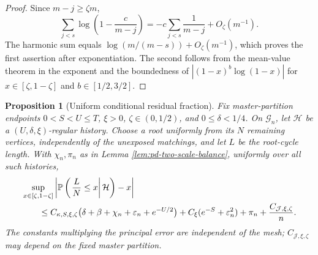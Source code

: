 \documentclass[11pt]{article}
\newtheorem{proposition}[theorem]{Proposition}
\theoremstyle{remark}
\newcommand{\Pp}{\mathbb P}
\begin{document}
\begin{proof}
Since $m-j\ge\zeta m$,
\[
 \sum_{j<s}\log\left(1-\frac c{m-j}\right)
 =-c\sum_{j<s}\frac1{m-j}+O_\zeta(m^{-1}).
\]
The harmonic sum equals
$\log(m/(m-s))+O_\zeta(m^{-1})$, which proves the first assertion after
exponentiation.  The second follows from the mean-value theorem in the exponent
and the boundedness of $|(1-x)^b\log(1-x)|$ for
$x\in[\zeta,1-\zeta]$ and $b\in[1/2,3/2]$.
\end{proof}

\begin{proposition}[Uniform conditional residual fraction]
\label{prop:pd-uniform-residual-fraction}
Fix master-partition endpoints $0<S<U\le T$, $\xi>0$,
$\zeta\in(0,1/2)$, and $0\le\delta<1/4$.  On $\mathcal G_n$, let
$\mathcal H$ be a $(U,\delta,\xi)$-regular history.  Choose a root uniformly
from its $N$ remaining vertices, independently of the unexposed matchings, and
let $L$ be the root-cycle length.  With $\chi_n,\pi_n$ as in Lemma
\ref{lem:pd-two-scale-balance}, uniformly over all such histories,
\begin{align}
 &\sup_{x\in[\zeta,1-\zeta]}
 \left|\Pp\left(\left.\frac LN\le x\right|\mathcal H\right)-x\right|
 \notag\\
 &\qquad\le
 C_{\kappa,S,\xi,\zeta}
 \bigl(\delta+\beta+\chi_n+\varepsilon_n+e^{-U/2}\bigr)
 +C_\xi(e^{-S}+\varepsilon_n^2)
 +\pi_n+\frac{C_{\mathcal J,\xi,\zeta}}n.
 \label{eq:pd-root-cdf}
\end{align}
The constants multiplying the principal error are independent of the mesh;
$C_{\mathcal J,\xi,\zeta}$ may depend on the fixed master partition.
\end{proposition}
\end{document}
